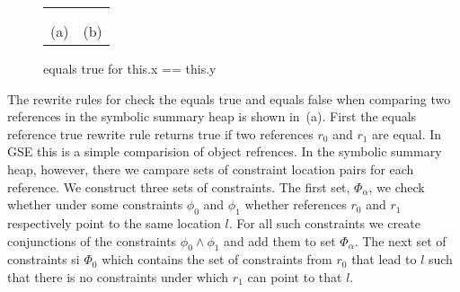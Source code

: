\newsavebox{\boxPEX}

\begin{figure*}
\begin{tabular}[c]{cl}
\usebox{\boxPEQ} & \usebox{\boxPEX} \\ \\
(a) & (b) \\
\end{tabular}
\caption{equals true for this.x == this.y}
\label{fig:eqs}
\end{figure*}


The rewrite rules for check the equals true and equals false when
comparing two references in the symbolic summary heap is shown
in~(a). First the equals reference true rewrite rule
returns true if two references $r_0$ and $r_1$ are equal. In GSE this
is a simple comparision of object refrences. In the symbolic summary
heap, however, there we campare sets of constraint location pairs for
each reference. We construct three sets of constraints. The first set,
$\Phi_\alpha$, we check whether under some constraints $\phi_0$ and
$\phi_1$ whether references $r_0$ and $r_1$ respectively point to the
same location $l$.  For all such constraints we create conjunctions of
the constraints $\phi_0 \wedge \phi_1$ and add them to set
$\Phi_\alpha$. The next set of constraints si $\Phi_0$ which contains
the set of constraints from $r_0$ that lead to $l$ such that there is
no constraints under which $r_1$ can point to that $l$.

